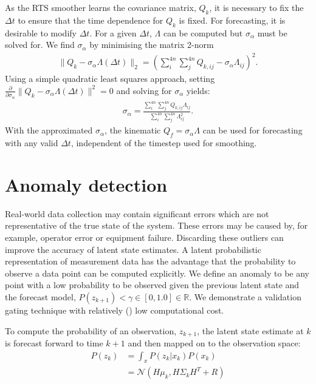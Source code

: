 \documentclass[pamm,a4paper,fleqn]{w-art}
\begin{document}
As the RTS smoother learns the covariance matrix, $Q_k$, it is necessary to fix the $\Delta t$ to ensure that the time dependence for $Q_k$ is fixed. For forecasting, it is desirable to modify $\Delta t$. For a given $\Delta t$, $\Lambda$ can be computed but $\sigma_\alpha$ must be solved for. We find $\sigma_\alpha$ by minimising the matrix 2-norm
\begin{align}
  \| Q_k - \sigma_\alpha \Lambda(\Delta t)\|_2 = \left( \sum_i^{4n} \sum_j^{4n} Q_{k,ij} - \sigma_\alpha \Lambda_{ij} \right)^2.
\end{align}
Using a simple quadratic least squares approach, setting $
  \frac{\partial}{\partial \sigma_\alpha}\| Q_k - \sigma_\alpha \Lambda(\Delta t)\|^2 = 0$ and solving for $\sigma_\alpha$ yields:
\begin{align}
  \sigma_\alpha = \frac{ \sum_i^{4n} \sum_j^{4n}Q_{k,ij}\Lambda_{ij}}{\sum_i^{4n} \sum_j^{4n} \Lambda_{ij}^2}.
\end{align}
With the approximated $\sigma_\alpha$, the kinematic $Q_f = \sigma_\alpha \Lambda$ can be used for forecasting with any valid $\Delta t$, independent of the timestep used for smoothing.


\section{Anomaly detection}

Real-world data collection may contain significant errors which are not representative of the true state of the system. These errors may be caused by, for example, operator error or equipment failure. Discarding these outliers can improve the accuracy of latent state estimates. A latent probabilistic representation of measurement data has the advantage that the probability to observe a data point can be computed explicitly. We define an anomaly to be any point with a low probability to be observed given the previous latent state and the forecast model, $P(z_{k+1}) < \gamma \in [0, 1.0] \in \mathbb{R}$. We demonstrate a validation gating technique \cite{spehn1990noise, labbe2014kalman} with relatively (\cite{sun2020new}) low computational cost.

To compute the probability of an observation, $z_{k+1}$, the latent state estimate at $k$ is forecast forward to time $k+1$ and then mapped on to the observation space:
\begin{align}
  P(z_k) &= \int_x P(z_k|x_k)P(x_k) \\
  &= \mathcal{N}\left(H\mu_k, H\Sigma_k H^T + R \right)
\end{align}
\end{document}
